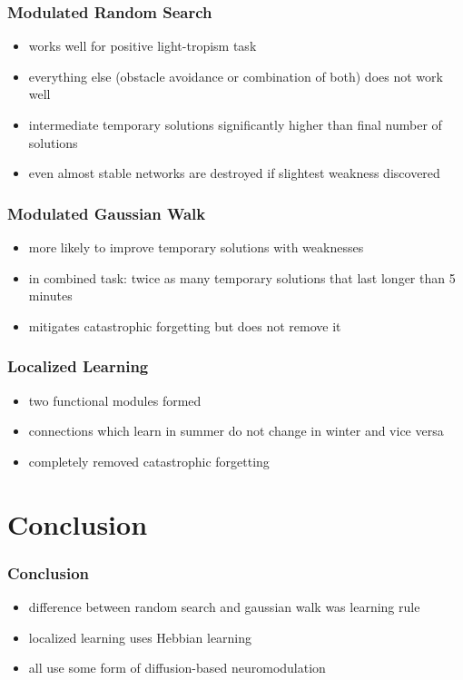 \documentclass[14pt]{beamer}
\theoremstyle{remark}
\begin{document}
\begin{frame}[t]
    \frametitle{Modulated Random Search}
    \begin{itemize}
        \item works well for positive light-tropism task
        \vfill
        \item everything else (obstacle avoidance or combination of both) does not
              work well
        \vfill
        \item intermediate temporary solutions significantly higher than final
              number of solutions
        \vfill
        \item even almost stable networks are destroyed if slightest weakness
              discovered
	\end{itemize}
\end{frame}

\begin{frame}[t]
    \frametitle{Modulated Gaussian Walk}
    \begin{itemize}
        \item more likely to improve temporary solutions with weaknesses
        \vfill
        \item in combined task: twice as many temporary solutions that last longer
              than 5 minutes
        \vfill
        \item mitigates catastrophic forgetting but does not remove it
	\end{itemize}
\end{frame}

\begin{frame}[t]
    \frametitle{Localized Learning}
    \begin{itemize}
        \item two functional modules formed
        \vfill
        \item connections which learn in summer do not change in winter and vice
              versa
        \vfill
        \item completely removed catastrophic forgetting
	\end{itemize}
\end{frame}

\section{Conclusion}

\begin{frame}[t]
    \frametitle{Conclusion}
    \begin{itemize}
        \item difference between random search and gaussian walk was learning rule
        \vfill
        \item localized learning uses Hebbian learning
        \vfill
        \item all use some form of diffusion-based neuromodulation
	\end{itemize}
\end{frame}
\end{document}
